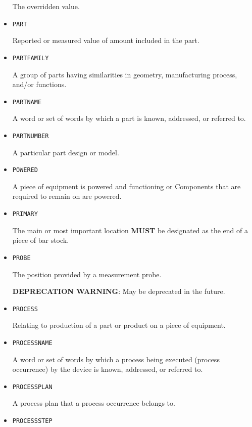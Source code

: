 \begin{itemize}
The overridden value.


\item \texttt{PART}  

Reported or measured value of amount included in the \gls{part}.


\item \texttt{PART\textunderscore FAMILY}  

A group of parts having similarities in geometry, manufacturing process, and/or functions.


\item \texttt{PART\textunderscore NAME}  

A word or set of words by which a part is known, addressed, or referred to.


\item \texttt{PART\textunderscore NUMBER}  

A particular part design or model.


\item \texttt{POWERED}  

A piece of equipment is powered and functioning or \glspl{Component} that are required to remain on are powered.


\item \texttt{PRIMARY}  

The main or most important location \textbf{MUST} be designated as the end of a piece of bar stock.


\item \texttt{PROBE}  

The position provided by a measurement probe.

\textbf{DEPRECATION WARNING}: May be deprecated in the future.


\item \texttt{PROCESS}  

Relating to production of a part or product on a piece of equipment.


\item \texttt{PROCESS\textunderscore NAME}  

A word or set of words by which a process being executed (process occurrence) by the device is known, addressed, or referred to.



\item \texttt{PROCESS\textunderscore PLAN}  

A process plan that a process occurrence belongs to.


\item \texttt{PROCESS\textunderscore STEP}  


\end{itemize}
